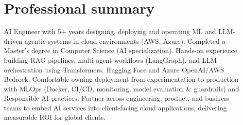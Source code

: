 \section{Professional summary}
AI Engineer with 5+ years designing, deploying and operating ML and LLM-driven agentic systems in cloud environments (AWS, Azure). Completed a Master's degree in Computer Science (AI specialization). Hands-on experience building RAG pipelines, multi-agent workflows (LangGraph), and LLM orchestration using Transformers, Hugging Face and Azure OpenAI/AWS Bedrock. Comfortable owning deployment from experimentation to production with MLOps (Docker, CI/CD, monitoring, model evaluation \& guardrails) and Responsible AI practices. Partner across engineering, product, and business teams to embed AI services into client-facing cloud applications, delivering measurable ROI for global clients.

